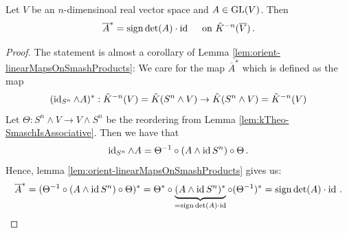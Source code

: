 \begin{proposition}\label{prop:linearyTheDeterminandDertermines}
    Let $V$ be an $n$-dimensinoal real vector space and $A\in \mathrm{GL}(V)$. Then 
    \begin{equation*}
        \overline{A}^*=\mathrm{sign} \det(A)\cdot \operatorname{\mathrm{id}} \quad \text{ on }\tilde{K}^{-n}(\overline{V})\,.
    \end{equation*}
\end{proposition}
\begin{proof}
    The statement is almost a corollary of Lemma \ref{lem:orient-linearMapsOnSmashProducts}:
    We care for the map $\overline{A}^*$ which is defined as the map
    \begin{equation*}
        (\operatorname{\mathrm{id}}_{S^n}\wedge A)^*:\tilde{K}^{-n}(V)=\tilde{K}(S^n\wedge V) \to \tilde{K}(S^n\wedge V)=\tilde{K}^{-n}(V)
    \end{equation*}
    Let $\Theta:S^n\wedge V\to V\wedge S^n$ be the reordering from Lemma \ref{lem:kTheo-SmaschIsAssociative}. Then we have that
    \begin{equation*}
       \operatorname{\mathrm{id}}_{S^n}\wedge A= \Theta^{-1}\circ (A \wedge \operatorname{\mathrm{id}}{S^n}) \circ \Theta\,.
    \end{equation*}Hence, lemma \ref{lem:orient-linearMapsOnSmashProducts} gives us:
    \begin{equation*}
        \overline{A}^*=(\Theta^{-1}\circ (A \wedge \operatorname{\mathrm{id}}{S^n}) \circ \Theta)^*=\Theta^*\circ \underbrace{(A \wedge \operatorname{\mathrm{id}}{S^n})^*}_{=\mathrm{sign} \det(A)\cdot \operatorname{\mathrm{id}}}\circ (\Theta^{-1})^*=\mathrm{sign} \det(A)\cdot \operatorname{\mathrm{id}}\,.
    \end{equation*}
\end{proof}

    



